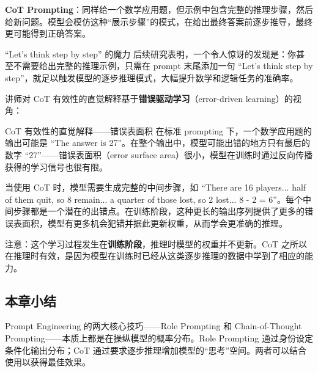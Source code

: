 \textbf{CoT Prompting}：同样给一个数学应用题，但示例中包含完整的推理步骤，然后给新问题。模型会模仿这种``展示步骤''的模式，在给出最终答案前逐步推导，最终更可能得到正确答案。

\begin{importantbox}{``Let's think step by step'' 的魔力}
后续研究表明，一个令人惊讶的发现是：你甚至不需要给出完整的推理示例，只需在 prompt 末尾添加一句 ``Let's think step by step''，就足以触发模型的逐步推理模式，大幅提升数学和逻辑任务的准确率。
\end{importantbox}

讲师对 CoT 有效性的直觉解释基于\textbf{错误驱动学习}（error-driven learning）的视角：

\begin{knowledgebox}{CoT 有效性的直觉解释——错误表面积}
在标准 prompting 下，一个数学应用题的输出可能是 ``The answer is 27''。在整个输出中，模型可能出错的地方只有最后的数字 ``27''——错误表面积（error surface area）很小，模型在训练时通过反向传播获得的学习信号也很有限。

当使用 CoT 时，模型需要生成完整的中间步骤，如 ``There are 16 players... half of them quit, so 8 remain... a quarter of those lost, so 2 lost... 8 - 2 = 6''。每个中间步骤都是一个潜在的出错点。在训练阶段，这种更长的输出序列提供了更多的错误表面积，模型有更多机会犯错并据此更新权重，从而学会更准确的推理。

注意：这个学习过程发生在\textbf{训练阶段}，推理时模型的权重并不更新。CoT 之所以在推理时有效，是因为模型在训练时已经从这类逐步推理的数据中学到了相应的能力。
\end{knowledgebox}

\subsection{本章小结}

Prompt Engineering 的两大核心技巧——Role Prompting 和 Chain-of-Thought Prompting——本质上都是在操纵模型的概率分布。Role Prompting 通过身份设定条件化输出分布；CoT 通过要求逐步推理增加模型的``思考''空间。两者可以结合使用以获得最佳效果。

